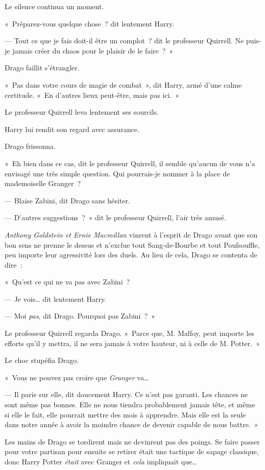 Le silence continua un moment.

«~Préparez-vous quelque chose~? dit lentement Harry.

--- Tout ce que je fais doit-il être un complot~? dit le professeur Quirrell.
Ne puis-je jamais créer du chaos pour le plaisir de le faire~?~»

Drago faillit s'étrangler.

«~Pas dans votre cours de magie de combat~», dit Harry, armé d'une calme certitude.
«~En d'autres lieux peut-être, mais pas ici.~»

Le professeur Quirrell leva lentement ses sourcils.

Harry lui rendit son regard avec assurance.

Drago frissonna.

«~Eh bien dans ce cas, dit le professeur Quirrell, il semble qu'aucun de vous n'a envisagé une très simple question.
Qui pourrais-je nommer à la place de mademoiselle Granger~?

--- Blaise Zabini, dit Drago sans hésiter.

--- D'autres suggestions~?~»
dit le professeur Quirrell, l'air très amusé.

\emph{Anthony Goldstein et Ernie Macmillan} vinrent à l'esprit de Drago avant que son bon sens ne prenne le dessus et n'exclue tout Sang-de-Bourbe et tout Poufsouffle, peu importe leur agressivité lors des duels.
Au lieu de cela, Drago se contenta de dire~:

«~Qu'est ce qui ne va pas avec Zabini~?

--- Je vois… dit lentement Harry.

--- Moi \emph{pas}, dit Drago.
Pourquoi pas Zabini~?~»

Le professeur Quirrell regarda Drago.
«~Parce que, M. Malfoy, peut importe les efforts qu'il y mettra, il ne sera jamais à votre hauteur, ni à celle de M. Potter.~»

Le choc stupéfia Drago.

«~Vous ne pouvez pas croire que \emph{Granger} va…

--- Il parie sur elle, dit doucement Harry.
Ce n'est pas garanti.
Les chances ne sont même pas bonnes.
Elle ne nous tiendra probablement jamais tête, et même si elle le fait, elle pourrait mettre des mois à apprendre.
Mais elle est la seule dans notre année à avoir la moindre chance de devenir capable de nous battre.~»

Les mains de Drago se tordirent mais ne devinrent pas des poings.
Se faire passer pour votre partisan pour ensuite se retirer était une tactique de sapage classique, donc Harry Potter \emph{était} avec Granger et \emph{cela} impliquait que…

